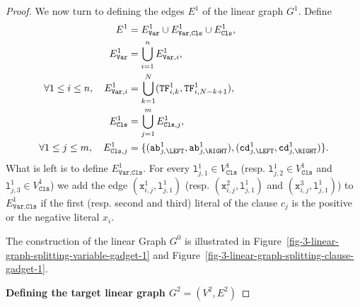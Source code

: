 \begin{proof}
    We now turn to defining the edges $E^{1}$ of the linear graph $G^{1}$.
    Define
    \begin{align*}
      E^{1} &= E^{1}_{\texttt{Var}} \cup E^{1}_{\texttt{Var},\texttt{Cls}} \cup E^{1}_{\texttt{Cls}},
      \\
      E^{1}_{\texttt{Var}} &= \bigcup_{i=1}^{n} E^{1}_{\texttt{Var}, i},
      \\
      \forall 1\leq i \leq n,\quad
      E^{1}_{\texttt{Var}, i} &= \bigcup_{k=1}^{N} (\texttt{TF}^{1}_{i,k}, \texttt{TF}^{1}_{i,N-k+1}),
      \\
      E^{1}_{\texttt{Cls}} &= \bigcup_{j=1}^{m} E^{1}_{\texttt{Cls}, j},
      \\
      \forall 1\leq j \leq m,\quad
      E^{1}_{\texttt{Cls}, j} &=
      \{
      (\texttt{ab}^{1}_{j,\LEFT}, \texttt{ab}^{1}_{j,\RIGHT}),
      (\texttt{cd}^{1}_{j,\LEFT}, \texttt{cd}^{1}_{j,\RIGHT})
      \}\text{.}
    \end{align*}
    What is left is to define $E^{1}_{\texttt{Var},\texttt{Cls}}$.
    For every $\texttt{l}^{1}_{j, 1} \in V^{1}_{\texttt{Cls}}$
    (resp. $\texttt{l}^{1}_{j, 2} \in V^{1}_{\texttt{Cls}}$ and
    $\texttt{l}^{1}_{j, 3} \in V^{1}_{\texttt{Cls}}$)
    we add
    the edge $(\texttt{x}^{1}_{i,j}, \texttt{l}^{1}_{j, 1})$
    (resp. $(\texttt{x}^{2}_{i,j}, \texttt{l}^{1}_{j, 1})$ and
    $(\texttt{x}^{3}_{i,j}, \texttt{l}^{1}_{j, 1})$)
    to $E^{1}_{\texttt{Var},\texttt{Cls}}$
    if the first (resp. second and third) literal of the clause $c_{j}$
    is the positive or the negative literal $x_{i}$.

  The construction of the linear Graph $G^{0}$ is illustrated
  in Figure~\ref{fig-3-linear-graph-splitting-variable-gadget-1} and
  Figure~\ref{fig-3-linear-graph-splitting-clause-gadget-1}.

  

  

  \medskip
  \textbf{Defining the target linear graph $G^{2} = (V^{2}, E^{2})$}
  \medskip


\end{proof}
